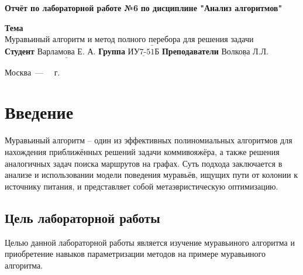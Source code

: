 \documentclass[12pt]{report}
\begin{document}
\begin{titlepage}
	
	\begin{center}
		\noindent\begin{minipage}{1.3\textwidth}\centering
			\Large\textbf{  Отчёт по лабораторной работе №6}\newline
			\textbf{по дисциплине "Анализ алгоритмов"}\newline\newline
		\end{minipage}
	\end{center}
	
	\noindent\textbf{Тема} $\underline{\text{Муравьиный алгоритм и метод полного перебора для решения задачи коммивояжёра}}$\newline\newline
	\noindent\textbf{Студент} $\underline{\text{Варламова Е. А.}}$\newline\newline
	\noindent\textbf{Группа} $\underline{\text{ИУ7-51Б}}$\newline\newline
	\noindent\textbf{Преподаватели} $\underline{\text{Волкова Л.Л.}}$\newline\newline\newline
	
	\begin{center}
		\vfill
		Москва~---~\the\year
		~г.
	\end{center}
\end{titlepage}

\setcounter{page}{2}
\tableofcontents
\newpage
\chapter*{Введение}
	
Муравьиный алгоритм -- один из эффективных полиномиальных алгоритмов для нахождения приближённых решений задачи коммивояжёра, а также решения аналогичных задач поиска маршрутов на графах. Суть подхода заключается в анализе и использовании модели поведения муравьёв, ищущих пути от колонии к источнику питания, и представляет собой метаэвристическую оптимизацию.
	
\section*{Цель лабораторной работы}
	
Целью данной лабораторной работы является изучение муравьиного алгоритма и приобретение навыков параметризации методов на примере муравьиного алгоритма.
	
\end{document}
